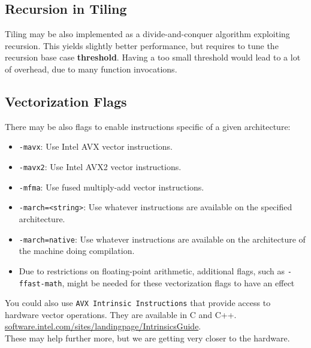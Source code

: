 \subsection{Recursion in Tiling}
Tiling may be also implemented as a divide-and-conquer algorithm exploiting recursion. This yields slightly better performance, but requires to tune the recursion base case \textbf{threshold}.
Having a too small threshold would lead to a lot of overhead, due to many function invocations.

\subsection{Vectorization Flags}
There may be also flags to enable instructions specific of a given architecture:
\begin{itemize}
   \item \texttt{-mavx}: Use Intel AVX vector instructions.
   \item \texttt{-mavx2}: Use Intel AVX2 vector instructions.
   \item \texttt{-mfma}: Use fused multiply-add vector instructions.
   \item \texttt{-march=<string>}: Use whatever instructions are available on the specified architecture.
   \item \texttt{-march=native}: Use whatever instructions are available on the architecture of the machine doing compilation.
   \item[] Due to restrictions on floating-point arithmetic, additional flags, such as \texttt{-ffast-math}, might be needed for these vectorization flags to have an effect
\end{itemize}

You could also use \texttt{AVX Intrinsic Instructions} that provide access to hardware vector operations. They are available in C and C++.
\href{https://software.intel.com/sites/landingpage/IntrinsicsGuide/}{software.intel.com/sites/landingpage/IntrinsicsGuide}.\\
These may help further more, but we are getting very closer to the hardware.